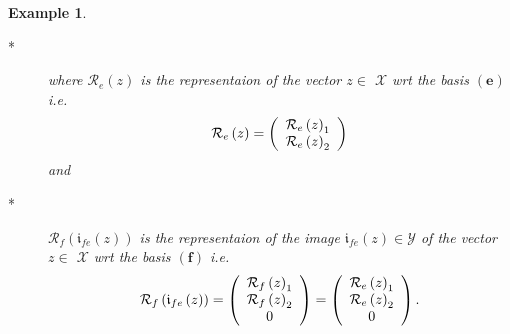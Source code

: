 \documentclass[aps,preprint]{revtex4}%
\newtheorem{example}[theorem]{Example}
\begin{document}
\begin{example}
\begin{enumerate}
\begin{enumerate}
\begin{description}
\item[*] where $\mathcal{R}_{e}\left(  z\right)  $ is the representaion of the
vector $z\in$ $\mathcal{X}$ wrt the basis $\left(  \mathbf{e}\right)  $ i.e.
\begin{equation}
\mathcal{R}_{e}\left(  z\right)  =\left(
\begin{array}
[c]{c}%
\mathcal{R}_{e}\left(  z\right)  _{1}\\
\mathcal{R}_{e}\left(  z\right)  _{2}%
\end{array}
\right)
\end{equation}
and

\item[*] $\mathcal{R}_{f}\left(  \mathfrak{i}_{fe}\left(  z\right)  \right)  $
is the representaion of the image $\mathfrak{i}_{fe}\left(  z\right)
\in\mathcal{Y}$ of the vector $z\in$ $\mathcal{X}$ wrt the basis $\left(
\mathbf{f}\right)  $ i.e.
\begin{equation}
\mathcal{R}_{f}\left(  \mathfrak{i}_{fe}\left(  z\right)  \right)  =\left(
\begin{array}
[c]{c}%
\mathcal{R}_{f}\left(  z\right)  _{1}\\
\mathcal{R}_{f}\left(  z\right)  _{2}\\
0
\end{array}
\right)  =\left(
\begin{array}
[c]{c}%
\mathcal{R}_{e}\left(  z\right)  _{1}\\
\mathcal{R}_{e}\left(  z\right)  _{2}\\
0
\end{array}
\right)  .
\end{equation}

\end{description}


\end{enumerate}
\end{enumerate}
\end{example}
\end{document}

